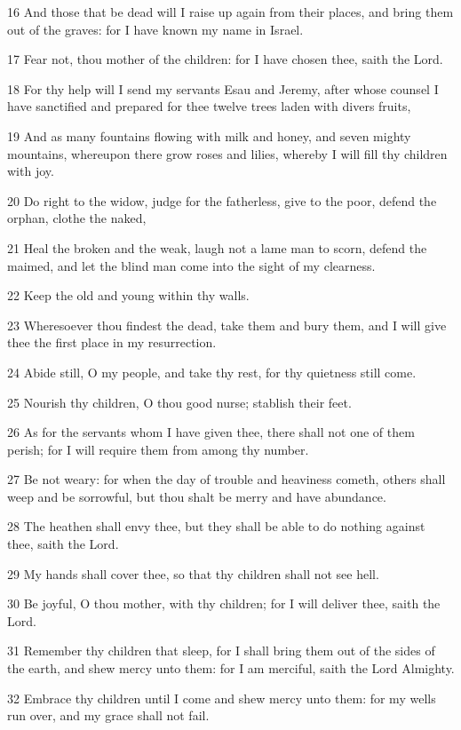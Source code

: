 \par 16 And those that be dead will I raise up again from their places, and bring them out of the graves: for I have known my name in Israel.
\par 17 Fear not, thou mother of the children: for I have chosen thee, saith the Lord.
\par 18 For thy help will I send my servants Esau and Jeremy, after whose counsel I have sanctified and prepared for thee twelve trees laden with divers fruits,
\par 19 And as many fountains flowing with milk and honey, and seven mighty mountains, whereupon there grow roses and lilies, whereby I will fill thy children with joy.
\par 20 Do right to the widow, judge for the fatherless, give to the poor, defend the orphan, clothe the naked,
\par 21 Heal the broken and the weak, laugh not a lame man to scorn, defend the maimed, and let the blind man come into the sight of my clearness.
\par 22 Keep the old and young within thy walls.
\par 23 Wheresoever thou findest the dead, take them and bury them, and I will give thee the first place in my resurrection.
\par 24 Abide still, O my people, and take thy rest, for thy quietness still come.
\par 25 Nourish thy children, O thou good nurse; stablish their feet.
\par 26 As for the servants whom I have given thee, there shall not one of them perish; for I will require them from among thy number.
\par 27 Be not weary: for when the day of trouble and heaviness cometh, others shall weep and be sorrowful, but thou shalt be merry and have abundance.
\par 28 The heathen shall envy thee, but they shall be able to do nothing against thee, saith the Lord.
\par 29 My hands shall cover thee, so that thy children shall not see hell.
\par 30 Be joyful, O thou mother, with thy children; for I will deliver thee, saith the Lord.
\par 31 Remember thy children that sleep, for I shall bring them out of the sides of the earth, and shew mercy unto them: for I am merciful, saith the Lord Almighty.
\par 32 Embrace thy children until I come and shew mercy unto them: for my wells run over, and my grace shall not fail.
